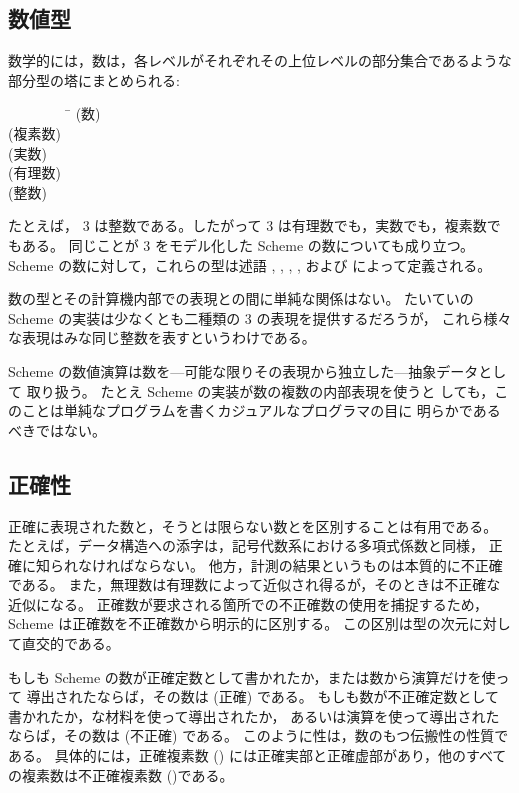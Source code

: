 \subsection{数値型}
\label{numericaltypes}

\vest 数学的には，数は，各レベルがそれぞれその上位レベルの部分集合であるような
部分型の塔にまとめられる:
\begin{tabbing}
\ \ \ \ \ \ \ \ \ \= (数) \\
\>  (複素数) \\
\>  (実数) \\
\>  (有理数) \\
\>  (整数) 
\end{tabbing}

たとえば， 3 は整数である。したがって 3 は有理数でも，実数でも，複素数でもある。
同じことが 3 をモデル化した Scheme の数についても成り立つ。
Scheme の数に対して，これらの型は述語 , , 
, , および  によって定義される。

数の型とその計算機内部での表現との間に単純な関係はない。
たいていの Scheme の実装は少なくとも二種類の 3 の表現を提供するだろうが，
これら様々な表現はみな同じ整数を表すというわけである。

Scheme の数値演算は数を---可能な限りその表現から独立した---抽象データとして
取り扱う。
たとえ Scheme の実装が数の複数の内部表現を使うと
しても，このことは単純なプログラムを書くカジュアルなプログラマの目に
明らかであるべきではない。

\subsection{正確性}

 \label{exactly}

正確に表現された数と，そうとは限らない数とを区別することは有用である。
たとえば，データ構造への添字は，記号代数系における多項式係数と同様，
正確に知られなければならない。
他方，計測の結果というものは本質的に不正確である。
また，無理数は有理数によって近似され得るが，そのときは不正確な近似になる。
正確数が要求される箇所での不正確数の使用を捕捉するため，
Scheme は正確数を不正確数から明示的に区別する。
この区別は型の次元に対して直交的である。

もしも Scheme の数が正確定数として書かれたか，または数から演算だけを使って
導出されたならば，その数は  (正確) である。
もしも数が不正確定数として書かれたか，な材料を使って導出されたか，
あるいは演算を使って導出されたならば，その数は  (不正確) である。
このように性は，数のもつ伝搬性の性質である。
具体的には，正確複素数 () には正確実部と正確虚部があり，他のすべての複素数は不正確複素数 ()である。

